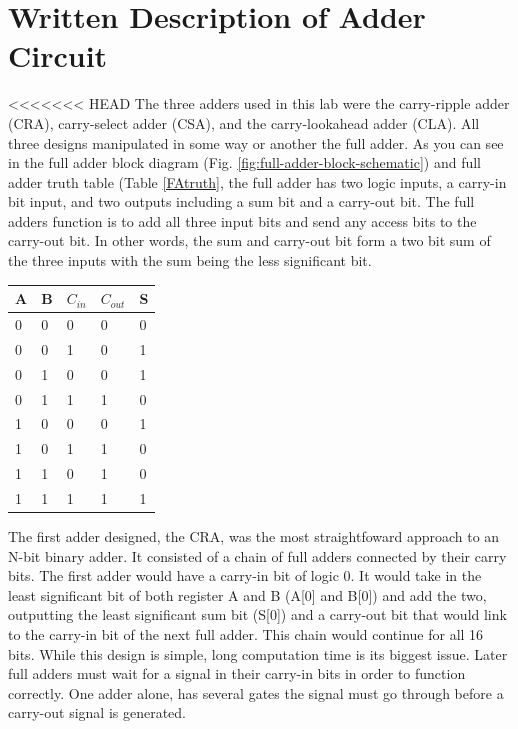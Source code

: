 \documentclass[journal, twocolumn, final,11pt,letterpaper]{IEEEtran}
\begin{document}
\section{Written Description of Adder Circuit}
<<<<<<< HEAD
The three adders used in this lab were the carry-ripple adder (CRA), carry-select adder (CSA), and the carry-lookahead adder (CLA).  All three designs manipulated in some way or another the full adder.  As you can see in the full adder block diagram (Fig. \ref{fig:full-adder-block-schematic}) and full adder truth table (Table \ref{FAtruth}, the full adder has two logic inputs, a carry-in bit input, and two outputs including a sum bit and a carry-out bit.  The full adders function is to add all three input bits and send any access bits to the carry-out bit.  In other words, the sum and carry-out bit form a two bit sum of the three inputs with the sum being the less significant bit.     
\begin{center}
	\begin{tabular}{lll|ll}
		A & B &$C_{in}$& $C_{out}$& S \\ \hline
		0 & 0 & 0      & 0 & 0\\
		0 & 0 & 1      & 0 & 1\\
		0 & 1 & 0      & 0 & 1\\
		0 & 1 & 1      & 1 & 0\\
		1 & 0 & 0      & 0 & 1\\
		1 & 0 & 1      & 1 & 0\\
		1 & 1 & 0      & 1 & 0\\
		1 & 1 & 1      & 1 & 1\\		
	\end{tabular}
	\label{FAtruth}
\end{center}
The first adder designed, the CRA,  was the most straightfoward approach to an N-bit binary adder.  It consisted of a chain of full adders connected by their carry bits. The first adder would have a carry-in bit of logic 0.  It would take in the least significant bit of both register A and B (A[0] and B[0]) and add the two, outputting the least significant sum bit (S[0]) and a carry-out bit that would link to the carry-in bit of the next full adder.  This chain would continue for all 16 bits.  While this design is simple, long computation time is its biggest issue.  Later full adders must wait for a signal in their carry-in bits in order to function correctly.  One adder alone, has several gates the signal must go through before a carry-out signal is generated.  
\end{document}

